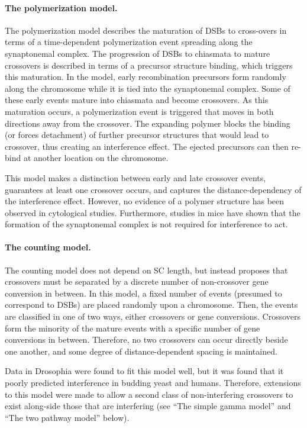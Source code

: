 \paragraph{The polymerization model.}
The polymerization model describes the maturation of DSBs to cross-overs in terms of a time-dependent polymerization event spreading along the synaptonemal complex\cite{King1990}.
The progression of DSBs to chiasmata to mature crossovers is described in terms of a precursor structure binding, which triggers this maturation.
In the model, early recombination precursors form randomly along the chromosome while it is tied into the synaptonemal complex.
Some of these early events mature into chiasmata and become crossovers.
As this maturation occurs, a polymerization event is triggered that moves in both directions away from the crossover.
The expanding polymer blocks the binding (or forces detachment) of further precursor structures that would lead to crossover, thus creating an interference effect.
The ejected precursors can then re-bind at another location on the chromosome.

This model makes a distinction between early and late crossover events, guarantees at least one crossover occurs, and captures the distance-dependency of the interference effect.
However, no evidence of a polymer structure has been observed in cytological studies.
Furthermore, studies in mice have shown that the formation of the synaptonemal complex is not required for interference to act\cite{DeBoer2007}.

\paragraph{The counting model.}
The counting model does not depend on SC length, but instead proposes that crossovers must be separated by a discrete number of non-crossover gene conversion in between\cite{Foss1993,Foss1995}.
In this model, a fixed number of events (presumed to correspond to DSBs) are placed randomly upon a chromosome.
Then, the events are classified in one of two ways, either crossovers or gene conversions.
Crossovers form the minority of the mature events with a specific number of gene conversions in between.
Therefore, no two crossovers can occur directly beside one another, and some degree of distance-dependent spacing is maintained.

Data in Drosophia were found to fit this model well, but it was found that it poorly predicted interference in budding yeast and humans\cite{Foss1995}.
Therefore, extensions to this model were made to allow a second class of non-interfering crossovers to exist along-side those that are interfering\cite{Housworth2003} (see ``The simple gamma model'' and ``The two pathway model'' below). %

